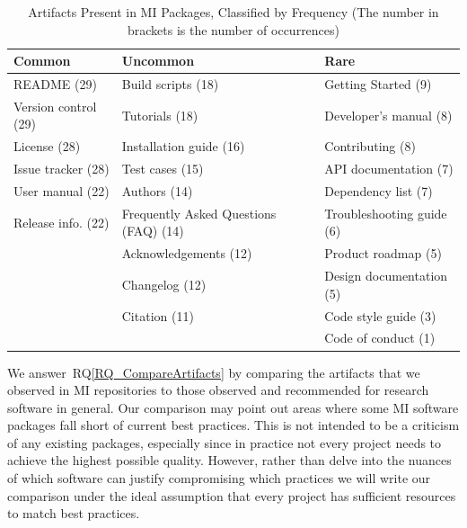 \documentclass[final, 3p, times, authoryear]{elsarticle}
\newcommand{\rqref}[1]{RQ\ref{#1}}
\begin{document}
\begin{table}[ht!]
    \begin{center}
    \begin{tabular}{ p{4.6 cm} p{5.6 cm} p{5 cm}}
    \toprule
    \textbf{Common} & \textbf{Uncommon} & \textbf{Rare} \\
    \midrule
    README (29) & Build scripts (18) & Getting Started (9)\\
    Version control (29) & Tutorials (18) & Developer's manual (8)\\
    License (28) & Installation guide (16) & Contributing (8)\\
    Issue tracker (28) & Test cases (15) & API documentation (7)\\
    User manual (22) & Authors (14) & Dependency list (7)\\
    Release info. (22) & Frequently Asked Questions (FAQ) (14) & Troubleshooting guide (6)\\
     & Acknowledgements (12) & Product roadmap (5)\\
     & Changelog (12) & Design documentation (5)\\
     & Citation (11) & Code style guide (3)\\
     & & Code of conduct (1)\\
    \bottomrule
    \end{tabular}
    \caption{Artifacts Present in MI Packages, Classified by Frequency (The number 
    in brackets is the number of occurrences)}
    \label{artifactspresent}
    \end{center}
\end{table}

We answer~\rqref{RQ_CompareArtifacts} by comparing the artifacts that we
observed in MI repositories to those observed and recommended for research
software in general. Our comparison may point out areas where some MI software
packages fall short of current best practices. This is not intended to be a
criticism of any existing packages, especially since in practice not every
project needs to achieve the highest possible quality. However, rather than
delve into the nuances of which software can justify compromising which
practices we will write our comparison under the ideal assumption that every
project has sufficient resources to match best practices.
    
\end{document}
